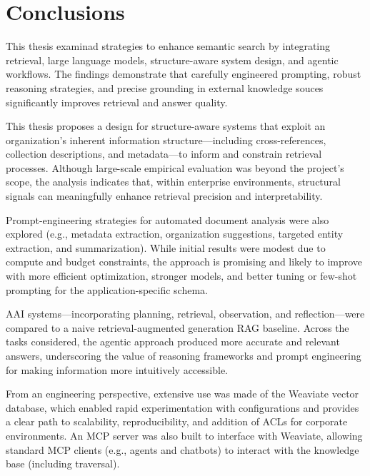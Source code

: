\cleardoublepage%
\label{chap:conclusion}%


\section{Conclusions}

This thesis examinad strategies to enhance semantic search by integrating retrieval, large language models, structure-aware system design, and agentic workflows. The findings demonstrate that carefully engineered prompting, robust reasoning strategies, and precise grounding in external knowledge souces significantly improves retrieval and answer quality.

This thesis proposes a design for structure-aware systems that exploit an organization's inherent information structure—including cross-references, collection descriptions, and metadata—to inform and constrain retrieval processes. Although large-scale empirical evaluation was beyond the project's scope, the analysis indicates that, within enterprise environments, structural signals can meaningfully enhance retrieval precision and interpretability.

Prompt-engineering strategies for automated document analysis were also explored (e.g., metadata extraction, organization suggestions, targeted entity extraction, and summarization). While initial results were modest due to compute and budget constraints, the approach is promising and likely to improve with more efficient optimization, stronger models, and better tuning or few-shot prompting for the application-specific schema.

\gls{AAI} systems—incorporating planning, retrieval, observation, and reflection—were compared to a naive retrieval-augmented generation \gls{RAG} baseline. Across the tasks considered, the agentic approach produced more accurate and relevant answers, underscoring the value of reasoning frameworks and prompt engineering for making information more intuitively accessible.

From an engineering perspective, extensive use was made of the Weaviate vector database, which enabled rapid experimentation with configurations and provides a clear path to scalability, reproducibility, and addition of \glspl{ACL} for corporate environments. An \gls{MCP} server was also built to interface with Weaviate, allowing standard \gls{MCP} clients (e.g., agents and chatbots) to interact with the knowledge base (including traversal).

